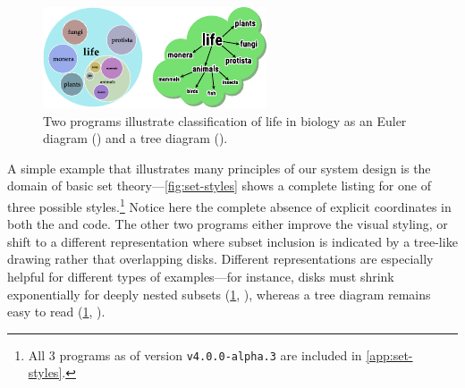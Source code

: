 \begin{figure}
   \centering
   \includegraphics[width=.7\linewidth]{assets/penrose/life.pdf}
   \caption{Two \Style{} programs illustrate classification of life in biology as an Euler diagram () and a tree diagram ().}
   \label{fig:set-life}
\end{figure}

A simple example that illustrates many principles of our system design is the domain of basic set theory---\cref{fig:set-styles} shows a complete listing for one of three possible styles.\footnote{All 3 \Style programs as of \Penrose{} version \texttt{v4.0.0-alpha.3} are included in \cref{app:set-styles}.}  Notice here the complete absence of explicit coordinates in both the \Substance{} and \Style{} code.  The other two \Style{} programs either improve the visual styling, or shift to a different representation where subset inclusion is indicated by a tree-like drawing rather that overlapping disks.  Different representations are especially helpful for different types of examples---for instance, disks must shrink exponentially for deeply nested subsets (\cref{fig:set-life}, ), whereas a tree diagram remains easy to read (\cref{fig:set-life}, ). 


